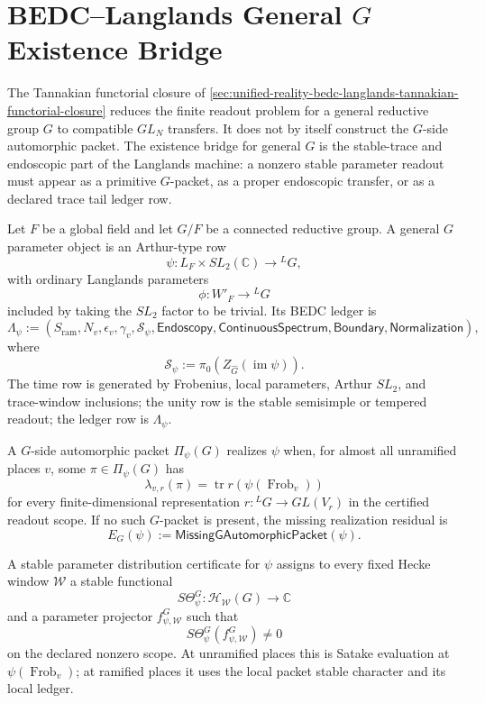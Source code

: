 \section{BEDC--Langlands General $G$ Existence Bridge}
\label{sec:unified-reality-bedc-langlands-general-g-existence-bridge}

The Tannakian functorial closure of
\autoref{sec:unified-reality-bedc-langlands-tannakian-functorial-closure}
reduces the finite readout problem for a general reductive group $G$ to
compatible $GL_N$ transfers. It does not by itself construct the
$G$-side automorphic packet. The existence bridge for general $G$ is the
stable-trace and endoscopic part of the Langlands machine: a nonzero
stable parameter readout must appear as a primitive $G$-packet, as a
proper endoscopic transfer, or as a declared trace tail ledger row.

\begin{definition}
\label{def:unified-reality-general-g-parameter-object}
Let $F$ be a global field and let $G/F$ be a connected reductive group.
A general $G$ parameter object is an Arthur-type row
$$
\psi:L_F\times SL_2(\mathbb C)\to{}^LG,
$$
with ordinary Langlands parameters
$$
\phi:W'_F\to{}^LG
$$
included by taking the $SL_2$ factor to be trivial. Its BEDC ledger is
$$
\Lambda_\psi
:=
(S_{\mathrm{ram}},N_v,\epsilon_v,\gamma_v,
\mathcal S_\psi,\mathsf{Endoscopy},\mathsf{ContinuousSpectrum},
\mathsf{Boundary},\mathsf{Normalization}),
$$
where
$$
\mathcal S_\psi
:=
\pi_0(Z_{\widehat G}(\operatorname{im}\psi)).
$$
The time row is generated by Frobenius, local parameters, Arthur
$SL_2$, and trace-window inclusions; the unity row is the stable
semisimple or tempered readout; the ledger row is $\Lambda_\psi$.
\end{definition}

\begin{definition}
\label{def:unified-reality-general-g-automorphic-realization-residual}
A $G$-side automorphic packet $\Pi_\psi(G)$ realizes $\psi$ when, for
almost all unramified places $v$, some $\pi\in\Pi_\psi(G)$ has
$$
\lambda_{v,r}(\pi)
=
\operatorname{tr}r(\psi(\operatorname{Frob}_v))
$$
for every finite-dimensional representation $r:{}^LG\to GL(V_r)$ in
the certified readout scope. If no such $G$-packet is present, the
missing realization residual is
$$
E_G(\psi)
:=
\mathsf{MissingGAutomorphicPacket}(\psi).
$$
\end{definition}

\begin{definition}
\label{def:unified-reality-general-g-stable-parameter-distribution}
A stable parameter distribution certificate for $\psi$ assigns to every
fixed Hecke window $\mathcal W$ a stable functional
$$
S\Theta_\psi^G:\mathcal H_{\mathcal W}(G)\to\mathbb C
$$
and a parameter projector $f_{\psi,\mathcal W}^G$ such that
$$
S\Theta_\psi^G(f_{\psi,\mathcal W}^G)\ne0
$$
on the declared nonzero scope. At unramified places this is Satake
evaluation at $\psi(\operatorname{Frob}_v)$; at ramified places it uses
the local packet stable character and its local ledger.
\end{definition}

